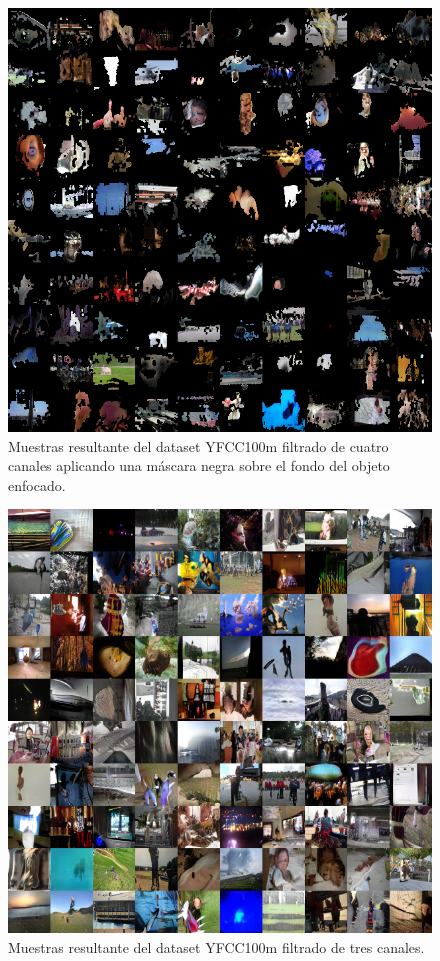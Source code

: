 \documentclass[spanish]{report}
\begin{document}
\begin{figure}[h]
\centering
 \includegraphics[width=\linewidth]{resultados/filtered_4chan_mask.png}
   \caption{Muestras resultante del dataset YFCC100m filtrado de cuatro canales aplicando una máscara negra sobre el fondo del objeto enfocado.}
  \label{fig:resultado_filtrado3}
\end{figure}

\begin{figure}[h]
\centering
 \includegraphics[width=\linewidth]{resultados/filtered_3chan.png}
   \caption{Muestras resultante del dataset YFCC100m filtrado de tres canales.}
  \label{fig:resultado_filtrado4}
\end{figure}
\end{document}
